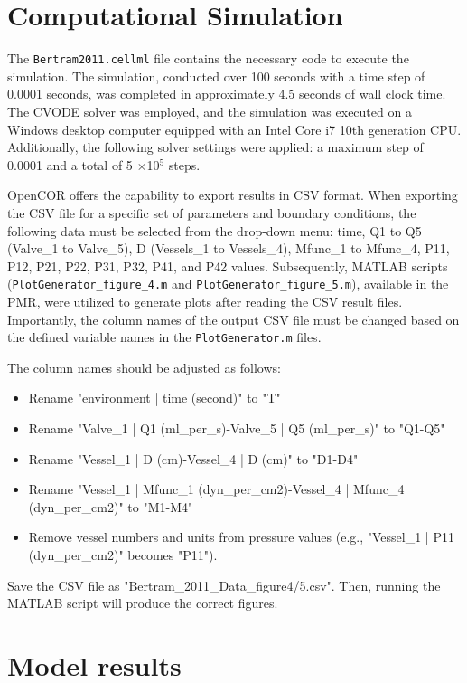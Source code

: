 \documentclass[fleqn,10pt]{physiome}
\begin{document}
\section{Computational Simulation}

The \texttt{Bertram2011.cellml} file contains the necessary code to execute the simulation. The simulation, conducted over 100 seconds with a time step of 0.0001 seconds, was completed in approximately 4.5 seconds of wall clock time. The CVODE solver was employed, and the simulation was executed on a Windows desktop computer equipped with an Intel Core i7 10th generation CPU. Additionally, the following solver settings were applied: a maximum step of 0.0001 and a total of 5 $\times$10$^{5}$ steps.


OpenCOR offers the capability to export results in CSV format. When exporting the CSV file for a specific set of parameters and boundary conditions, the following data must be selected from the drop-down menu: time, Q1 to Q5 (Valve\_1 to Valve\_5), D (Vessels\_1 to Vessels\_4), Mfunc\_1 to Mfunc\_4, P11, P12, P21, P22, P31, P32, P41, and P42 values. Subsequently, MATLAB scripts (\texttt{PlotGenerator\_figure\_4.m} and \texttt{PlotGenerator\_figure\_5.m}), available in the PMR, were utilized to generate plots after reading the CSV result files. Importantly, the column names of the output CSV file must be changed based on the defined variable names in the \texttt{PlotGenerator.m} files.

The column names should be adjusted as follows:
\begin{itemize}
    \item Rename "environment | time (second)" to "T"
    \item Rename "Valve\_1 | Q1 (ml\_per\_s)-Valve\_5 | Q5 (ml\_per\_s)" to "Q1-Q5"
     \item Rename "Vessel\_1 | D (cm)-Vessel\_4 | D (cm)" to "D1-D4"
    \item Rename "Vessel\_1 | Mfunc\_1 (dyn\_per\_cm2)-Vessel\_4 | Mfunc\_4 (dyn\_per\_cm2)" to "M1-M4"
    \item Remove vessel numbers and units from pressure values (e.g., "Vessel\_1 | P11 (dyn\_per\_cm2)" becomes "P11").
\end{itemize}

Save the CSV file as "Bertram\_2011\_Data\_figure4/5.csv". Then, running the MATLAB script will produce the correct figures.



\section{Model results}
\end{document}
